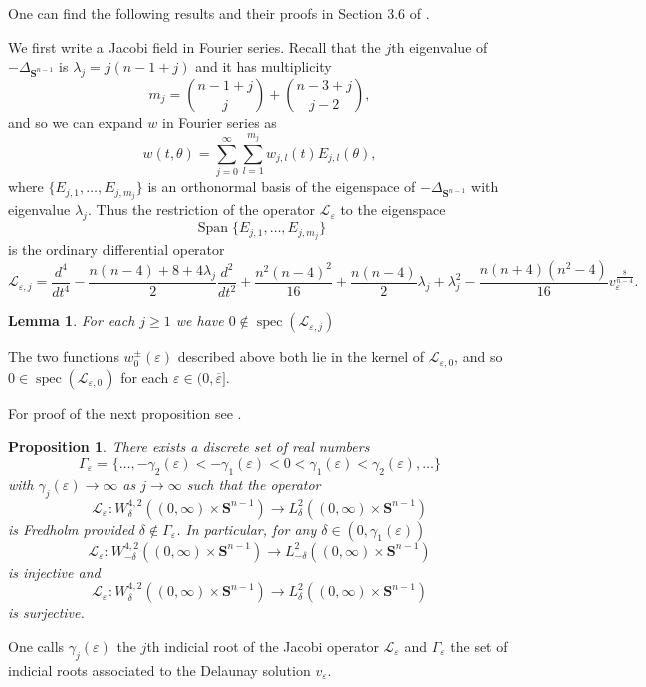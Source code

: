 \documentclass[reqno,11pt]{amsart}
\newtheorem{lemma}[theorem]{Lemma}
\newtheorem{proposition}[theorem]{Proposition}
\theoremstyle{tttheorem}
\newcommand{\Ss}{\mathbf{S}}
\begin{document}
One can find the following results and their proofs 
in Section 3.6 of \cite{jesse2020}. 

We first write a Jacobi field in Fourier series. Recall that the 
$j$th eigenvalue of $-\Delta_{\Ss^{n-1}}$ is $\lambda_j = j(n-1+j)$ 
and it has multiplicity 
$$m_j = \binom{n-1+j}{j} + \binom{n-3+j}{j-2},$$
and so we can expand $w$ in Fourier series as 
$$w(t,\theta) = \sum_{j=0}^\infty \sum_{l=1}^{m_j} w_{j,l} (t) 
E_{j,l}(\theta),$$
where $\{E_{j,1}, \dots, E_{j, m_j}\}$ is an orthonormal basis of the 
eigenspace of $-\Delta_{\Ss^{n-1}}$ with eigenvalue $\lambda_j$.
Thus the restriction of the operator $\mathcal{L}_\varepsilon$ 
to the eigenspace 
$$\operatorname{Span} \{ E_{j,1}, \dots, E_{j, m_j}\}$$
is the ordinary differential operator 
$$\mathcal{L}_{\varepsilon, j}  =  \frac{d^4}{dt^4} - 
\frac{n(n-4)+8+4\lambda_j }{2}\frac{d^2}{dt^2} + 
\frac{n^2(n-4)^2}{16} + \frac{n(n-4)}{2}\lambda_j +\lambda_j^2 - 
\frac{n(n+4)(n^2-4)}{16} v_\varepsilon^{\frac{8}{n-4}}.$$
\begin{lemma} For each $j \geq 1$ we have $0 \not \in 
\operatorname{spec} (\mathcal{L}_{\varepsilon,j})$
\end{lemma} 

The two functions $w_0^\pm(\varepsilon)$ described above both lie in the 
kernel of $\mathcal{L}_{\varepsilon,0}$, and so $0 \in 
\operatorname{spec}(\mathcal{L}_{\varepsilon,0})$ for each 
$\varepsilon \in (0,\overline{\varepsilon}]$. 

For proof of the next proposition see \cite[Proposition 28]{jesse2020}.

\begin{proposition} \label{prop:del_fredholm} 
There exists a discrete set of real numbers 
\begin{equation} \label{del_indicial_roots} 
\Gamma_\varepsilon = \{ \dots, -\gamma_2(\varepsilon) < 
-\gamma_1(\varepsilon) < 0 < \gamma_1(\varepsilon)  < \gamma_2(\varepsilon), 
\dots \}
\end{equation}
with $\gamma_j(\varepsilon) \rightarrow \infty$ as $j \rightarrow \infty$ 
such that the operator 
$$\mathcal{L}_\varepsilon : W^{4,2}_\delta((0,\infty) \times \Ss^{n-1}) 
\rightarrow L^2_\delta((0,\infty) \times \Ss^{n-1}) $$
is Fredholm provided $\delta \not \in \Gamma_\varepsilon$. In particular, 
for any $\delta \in (0,\gamma_1(\varepsilon))$ 
$$\mathcal{L}_\varepsilon : W^{4,2}_{-\delta} ((0,\infty) \times \Ss^{n-1}) 
\rightarrow L^2_{-\delta} ((0,\infty) \times \Ss^{n-1}) $$
is injective and 
$$\mathcal{L}_\varepsilon : W^{4,2}_\delta ((0,\infty) \times \Ss^{n-1}) 
\rightarrow L^2_\delta ((0,\infty) \times \Ss^{n-1})$$
is surjective. 
\end{proposition} 
One calls $\gamma_j(\varepsilon)$ the $j$th indicial root of the Jacobi 
operator $\mathcal{L}_\varepsilon$ and $\Gamma_\varepsilon$ the set of 
indicial roots associated to the Delaunay solution $v_\varepsilon$. 
\end{document}
